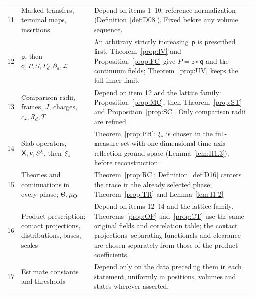 \begin{longtable}{@{}p{}p{}p{}@{}}
11 & \raggedright Marked transfers, terminal maps, insertions & Depend on items 1--10; reference normalization (Definition~\ref{def:D08}). Fixed before any volume sequence.\\[3pt]
12 & \raggedright $\mathsf p$, then $\mathsf q,P,S,F_d,\partial_a,\mathcal L$ & An arbitrary strictly increasing~$\mathsf p$ is prescribed first. Theorem~\ref{prop:IV} and Proposition~\ref{prop:FC} give $P=\mathsf p\circ\mathsf q$ and the continuum fields; Theorem~\ref{prop:UV} keeps the full inner limit.\\[3pt]
13 & \raggedright Comparison radii, frames, $J$, charges, $c_\star,R_d,T$ & Depend on item 12 and the lattice family: Proposition~\ref{prop:MC}, then Theorem~\ref{prop:ST} and Proposition~\ref{prop:SC}. Only comparison radii are refined.\\[3pt]
14 & \raggedright Slab operators, $\mathsf{X},\nu,S^\xi$, then~$\xi_*$ & Theorem~\ref{prop:PH}; $\xi_*$ is chosen in the full-measure set with one-dimensional time-axis reflection ground space (Lemma~\ref{lem:H1.3}), before reconstruction.\\[3pt]
15 & \raggedright Theories and continuations in every phase; $\Theta,\mu_{\Theta}$ & Theorem~\ref{prop:RC}; Definition~\ref{def:D16} centers the trace in the already selected phase; Theorem~\ref{prop:TR} and Lemma~\ref{lem:I1.2}.\\[3pt]
16 & \raggedright Product prescription; contact projections, distributions, bases, scales & Depend on items 12--14 and the lattice family. Theorems~\ref{prop:OP} and~\ref{prop:CT} use the same original fields and correlation table; the contact projections, separating functionals and clearance are chosen separately from those of the product coefficients.\\[3pt]
17 & \raggedright Estimate constants and thresholds & Depend only on the data preceding them in each statement, uniformly in positions, volumes and states wherever asserted.\\
\end{longtable}
\endgroup
